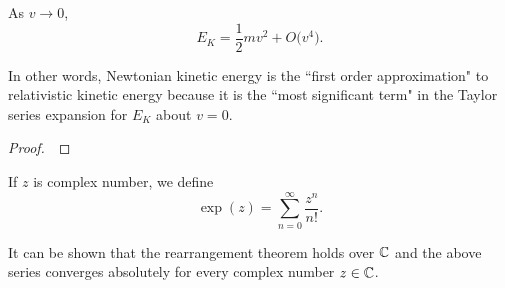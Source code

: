 \begin{theorem}
As $v\to 0$,
\begin{equation*}
E_K = \frac{1}{2}mv^2 + O\big(v^4\big).
\end{equation*}
\end{theorem}
\begin{remark}
In other words, Newtonian kinetic energy is the ``first order approximation" to relativistic kinetic energy because it is the ``most significant term" in the Taylor series expansion for $E_K$ about $v=0$.
\end{remark}
\ifdefined\SOLUTION
{}
\else
\begin{proof}
\,
\vspace{3.1in}

\end{proof}
\fi

\newpage


\begin{definition}
If $z$ is complex number, we define
\begin{equation*}
\exp(z) = \sum_{n=0}^\infty \frac{z^n}{n!}.
\end{equation*}
\end{definition}

\begin{remark}
It can be shown that the rearrangement theorem holds over $\mathbb C$ and the above series converges absolutely for every complex number $z\in\mathbb C$.
\end{remark}

